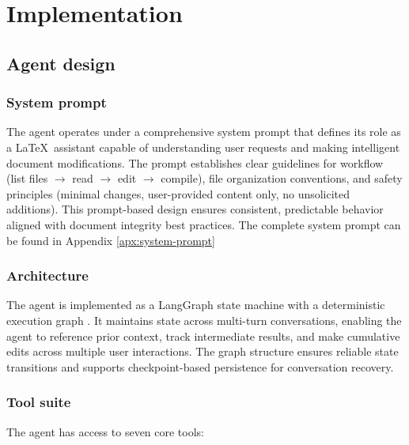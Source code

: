\section{Implementation}

\subsection{Agent design}

\subsubsection{System prompt}

The agent operates under a comprehensive system prompt that defines its role as a \LaTeX\ assistant capable of understanding user requests and making intelligent document modifications.
The prompt establishes clear guidelines for workflow (list files $\rightarrow$ read $\rightarrow$ edit $\rightarrow$ compile), file organization conventions, and safety principles (minimal changes, user-provided content only, no unsolicited additions).
This prompt-based design ensures consistent, predictable behavior aligned with document integrity best practices.
The complete system prompt can be found in Appendix \ref{apx:system-prompt}

\subsubsection{Architecture}

The agent is implemented as a LangGraph state machine with a deterministic execution graph \cite{langgraph}.
It maintains state across multi-turn conversations, enabling the agent to reference prior context, track intermediate results, and make cumulative edits across multiple user interactions.
The graph structure ensures reliable state transitions and supports checkpoint-based persistence for conversation recovery.

\subsubsection{Tool suite}

The agent has access to seven core tools:

